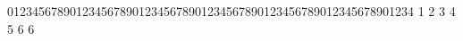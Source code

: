 01234567890123456789012345678901234567890123456789012345678901234
          1         2         3         4         5         6   6   
